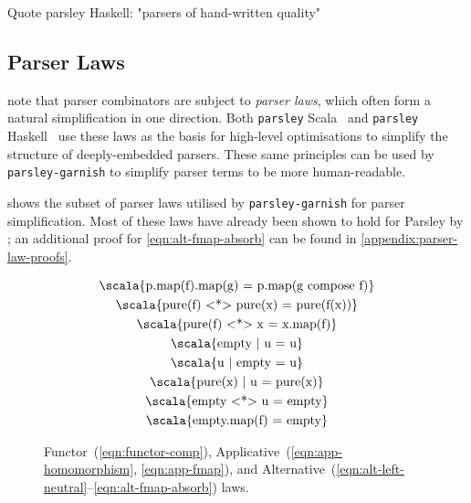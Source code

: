 \documentclass[../../../main.tex]{subfiles}
\begin{document}
Quote parsley Haskell: "parsers of hand-written quality"


\subsection{Parser Laws}
\textcite{willis_staged_2023} note that parser combinators are subject to \emph{parser laws}, which often form a natural simplification in one direction.
Both \texttt{parsley} Scala~\cite{willis_garnishing_2018} and \texttt{parsley} Haskell~\cite{willis_parsley_2023} use these laws as the basis for high-level optimisations to simplify the structure of deeply-embedded parsers.
These same principles can be used by \texttt{parsley-garnish} to simplify parser terms to be more human-readable.

 shows the subset of parser laws utilised by \texttt{parsley-garnish} for parser simplification.
Most of these laws have already been shown to hold for Parsley by \textcite{willis_garnishing_2018}; an additional proof for \cref{eqn:alt-fmap-absorb} can be found in \cref{appendix:parser-law-proofs}.

\begin{figure}[htbp]
\centering
\begin{gather}
  \text{\scala{p.map(f).map(g) = p.map(g compose f)}} \label{eqn:functor-comp} \\
  \text{\scala{pure(f) <*> pure(x) = pure(f(x))}} \label{eqn:app-homomorphism} \\
  \text{\scala{pure(f) <*> x = x.map(f)}} \label{eqn:app-fmap} \\
  \text{\scala{empty | u = u}} \label{eqn:alt-left-neutral} \\
  \text{\scala{u | empty = u}} \label{eqn:alt-right-neutral} \\
  \text{\scala{pure(x) | u = pure(x)}} \label{eqn:alt-left-biased-choice} \\
  \text{\scala{empty <*> u = empty}} \label{eqn:alt-empty-absorb} \\
  \text{\scala{empty.map(f) = empty}} \label{eqn:alt-fmap-absorb}
\end{gather}
\caption{Functor~(\ref{eqn:functor-comp}), Applicative~(\ref{eqn:app-homomorphism}, \ref{eqn:app-fmap}), and Alternative~(\ref{eqn:alt-left-neutral}--\ref{eqn:alt-fmap-absorb}) laws.}
\label{fig:parser-laws}
\end{figure}
\end{document}
